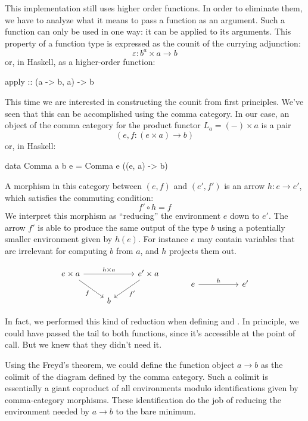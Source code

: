 \documentclass[DaoFP]{subfiles}
\begin{document}
This implementation still uses higher order functions. In order to eliminate them, we have to analyze what it means to pass a function as an argument. Such a function can only be used in one way: it can be applied to its arguments. This property of a function type is expressed as the counit of the currying adjunction:
\[ \varepsilon \colon b^a \times a \to b \]
or, in Haskell, as a higher-order function:
\begin{haskell}
apply :: (a -> b, a) -> b
\end{haskell}
This time we are interested in constructing the counit from first principles. We've seen that this can be accomplished using the comma category. In our case, an object of the comma category for the product functor $L_a = (-) \times a$ is a pair 
\[(e, f \colon (e \times a) \to b) \]
or, in Haskell:
\begin{haskell}
data Comma a b e = Comma e ((e, a) -> b)
\end{haskell}
A morphism in this category between $(e, f)$ and $(e', f')$ is an arrow $h \colon e \to e'$, which satisfies the commuting condition:
\[ f' \circ h = f \]
We interpret this morphism as ``reducing'' the environment $e$ down to $e'$. The arrow $f'$ is able to produce the same output of the type $b$ using a potentially smaller environment given by $h (e)$. For instance $e$ may contain variables that are irrelevant for computing $b$ from $a$, and $h$ projects them out. 

\[
 \begin{tikzcd}
 e \times a
 \arrow[rd, "f"']
 \arrow[rr, "h \times a"]
 && e' \times a
 \arrow[ld, "f'"]
 \\
 &b
  \end{tikzcd}
 \hspace{30pt}
\begin{tikzcd}
 e
 \arrow[rr, "h"]
 && e'
  \end{tikzcd}
\]


In fact, we performed this kind of reduction when defining  and . In principle, we could have passed the tail  to both functions, since it's accessible at the point of call. But we knew that they didn't need it.

Using the Freyd's theorem, we could define the function object $a \to b$ as the colimit of the diagram defined by the comma category. Such a colimit is essentially a giant coproduct of all environments modulo identifications given by comma-category morphisms. These identification do the job of reducing the environment needed by $a \to b$ to the bare minimum. 
\end{document}
